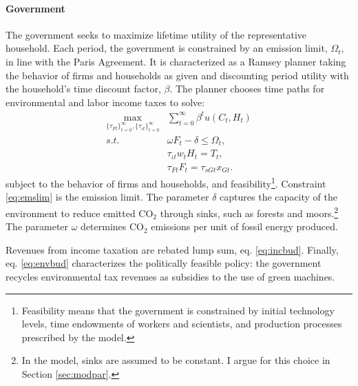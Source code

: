 \paragraph{Government}
The government seeks to maximize lifetime utility of the representative household. Each period, the government is constrained by an emission limit, $\Omega_t$, in line with the Paris Agreement.  
It is characterized as a Ramsey planner taking the behavior of firms and households as given and discounting period utility with the household's time discount factor, $\beta$.
The planner chooses time paths for environmental and labor income taxes to solve:%
\begin{align}
	\underset{\{\tau_{Ft}\}_{t=0}^{\infty},\{\tau_{\iota t}\}_{t=0}^{\infty}}{\max}&\sum_{t=0}^{\infty}\beta^t u(C_{t}, H_{t})%
	\nonumber \\
	s.t.\ \  %
	&  \omega F_{t} -\delta \leq \Omega_t, \label{eq:emslim} %
	\\ %
	&  \tau_{\iota t}w_tH_t=T_t, \label{eq:incbud}\\
	&  \tau_{Ft}F_{t}=\tau_{sGt}x_{Gt}.\label{eq:envbud}
\end{align}
subject to the behavior of firms and households, and feasibility\footnote{Feasibility means that the government is constrained by initial technology levels, time endowments of workers and scientists, and production processes prescribed by the model.}. 
Constraint \eqref{eq:emslim} is the emission limit. The parameter $\delta$ captures the capacity of the environment to reduce emitted CO$_2$ through sinks, such as forests and moors.\footnote{ In the model, sinks are assumed to be constant. I argue for this choice in Section \ref{sec:modpar}.}  The parameter $\omega$ determines  CO$_2$ emissions per unit of fossil energy produced. %

Revenues from income taxation are rebated lump sum, eq. \eqref{eq:incbud}.
Finally, eq. \eqref{eq:envbud} characterizes the politically feasible policy: the government recycles environmental tax revenues as subsidies to the use of green machines.

